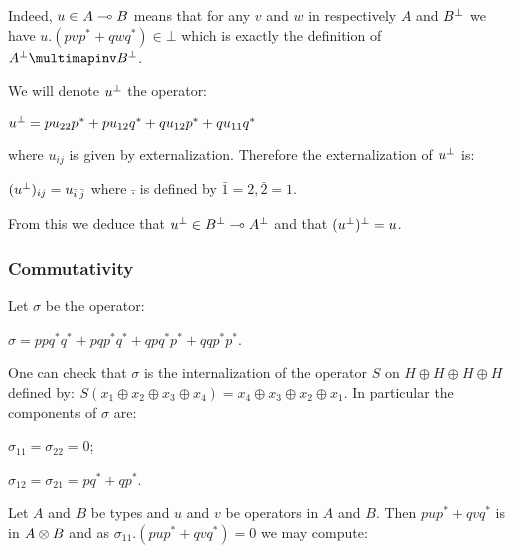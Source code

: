 Indeed, \(u\in A\multimap B\) means that for any \(v\) and \(w\) in
respectively \(A\) and \(B^\bot\) we have \(u.(pvp^* + qwq^*)\in\bot\)
which is exactly the definition of \(A\orth\limpinv B\orth\).

We will denote \(u^\bot\) the operator:

\begin{description}
\tightlist
\item[]
\(u^\bot = pu_{22}p^* + pu_{12}q^* + qu_{12}p^* + qu_{11}q^*\)
\end{description}

where \(u_{ij}\) is given by externalization. Therefore the
externalization of \(u^\bot\) is:

\begin{description}
\tightlist
\item[]
\((u^\bot)_{ij} = u_{\bar i\,\bar j}\) where \(\bar .\) is defined by
\(\bar1 = 2, \bar2 = 1\).
\end{description}

From this we deduce that \(u^\bot\in B^\bot\multimap A^\bot\) and that
\((u^\bot)^\bot = u\).

\subsubsection{Commutativity}\label{commutativity}

Let \(\sigma\) be the operator:

\begin{description}
\tightlist
\item[]
\(\sigma = ppq^*q^* +pqp^*q^* + qpq^*p^* + qqp^*p^*\).
\end{description}

One can check that \(\sigma\) is the internalization of the operator
\(S\) on \(H\oplus H\oplus H\oplus H\) defined by:
\(S(x_1\oplus x_2\oplus x_3\oplus x_4) = x_4\oplus x_3\oplus x_2\oplus x_1\).
In particular the components of \(\sigma\) are:

\begin{description}
\tightlist
\item[]
\(\sigma_{11} = \sigma_{22} = 0\);

\(\sigma_{12} = \sigma_{21} = pq^* + qp^*\).
\end{description}

Let \(A\) and \(B\) be types and \(u\) and \(v\) be operators in \(A\)
and \(B\). Then \(pup^* + qvq^*\) is in \(A\otimes B\) and as
\(\sigma_{11}.(pup^* + qvq^*) = 0\) we may compute:

